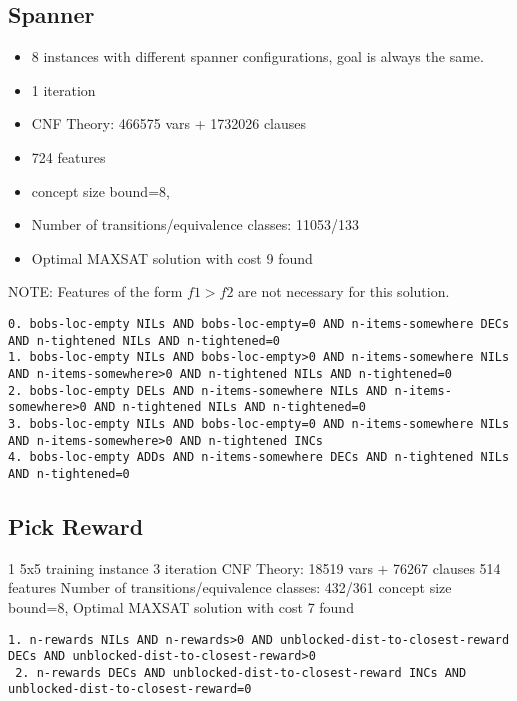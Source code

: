 \documentclass[a4paper]{article}
\begin{document}
\subsection{Spanner}

\begin{itemize}
 \item 8 instances with different spanner configurations, goal is always the same.
 \item 1 iteration
 \item CNF Theory: 466575 vars + 1732026 clauses
 \item 724 features
 \item concept size bound=8,
 \item Number of transitions/equivalence classes: 11053/133
 \item Optimal MAXSAT solution with cost 9 found
\end{itemize}


NOTE: Features of the form $f1>f2$ are not necessary for this solution.

\begin{Verbatim}[fontsize=\footnotesize]
0. bobs-loc-empty NILs AND bobs-loc-empty=0 AND n-items-somewhere DECs AND n-tightened NILs AND n-tightened=0
1. bobs-loc-empty NILs AND bobs-loc-empty>0 AND n-items-somewhere NILs AND n-items-somewhere>0 AND n-tightened NILs AND n-tightened=0
2. bobs-loc-empty DELs AND n-items-somewhere NILs AND n-items-somewhere>0 AND n-tightened NILs AND n-tightened=0
3. bobs-loc-empty NILs AND bobs-loc-empty=0 AND n-items-somewhere NILs AND n-items-somewhere>0 AND n-tightened INCs
4. bobs-loc-empty ADDs AND n-items-somewhere DECs AND n-tightened NILs AND n-tightened=0
\end{Verbatim}

\subsection{Pick Reward}
1 5x5 training instance
3 iteration
CNF Theory: 18519 vars + 76267 clauses
514 features
Number of transitions/equivalence classes: 432/361
concept size bound=8,
Optimal MAXSAT solution with cost 7 found

\begin{Verbatim}[fontsize=\footnotesize]
 1. n-rewards NILs AND n-rewards>0 AND unblocked-dist-to-closest-reward DECs AND unblocked-dist-to-closest-reward>0
 2. n-rewards DECs AND unblocked-dist-to-closest-reward INCs AND unblocked-dist-to-closest-reward=0
\end{Verbatim}




\end{document}
